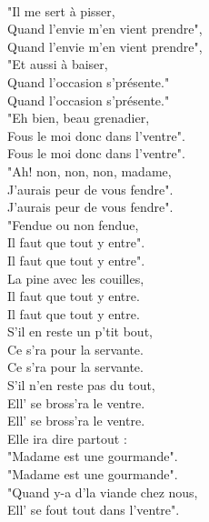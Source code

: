 \\"Il me sert à pisser,
\\Quand l'envie m'en vient prendre",
\\
{Quand l'envie m'en vient prendre",}
\\"Et aussi à baiser,
\\Quand l'occasion s'présente."
\\
{Quand l'occasion s'présente."}
\\"Eh bien, beau grenadier,
\\Fous le moi donc dans l'ventre".
\\
{Fous le moi donc dans l'ventre".}
\\"Ah! non, non, non, madame,
\\J'aurais peur de vous fendre".
\\
{J'aurais peur de vous fendre".}
\\"Fendue ou non fendue,
\\Il faut que tout y entre".
\\
{Il faut que tout y entre".}
\\La pine avec les couilles,
\\Il faut que tout y entre.
\\
{Il faut que tout y entre. ~~}
\\S'il en reste un p'tit bout,
\\Ce s'ra pour la servante.
\\
{Ce s'ra pour la servante.}
\\S'il n'en reste pas du tout,
\\Ell' se bross'ra le ventre.
\breakpage
\\
{Ell' se bross'ra le ventre.}
\\Elle ira dire partout :
\\"Madame est une gourmande".
\\
{"Madame est une gourmande".~~~~}
\\"Quand y-a d'la viande chez nous,
\\Ell' se fout tout dans l'ventre".
\\
\bigskip
